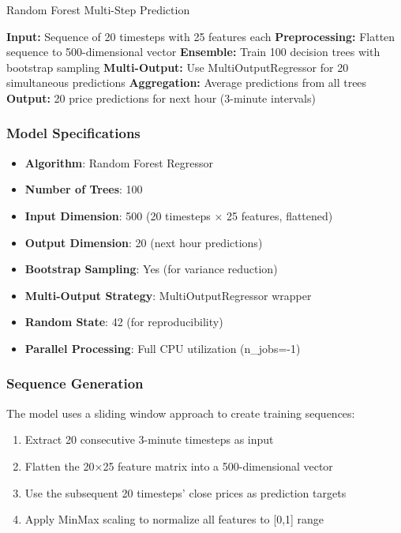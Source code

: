 \documentclass[11pt,a4paper]{article}
\begin{document}
\begin{algorithm}
\caption{Random Forest Multi-Step Prediction}
\begin{algorithmic}[1]
\State \textbf{Input:} Sequence of 20 timesteps with 25 features each
\State \textbf{Preprocessing:} Flatten sequence to 500-dimensional vector
\State \textbf{Ensemble:} Train 100 decision trees with bootstrap sampling
\State \textbf{Multi-Output:} Use MultiOutputRegressor for 20 simultaneous predictions
\State \textbf{Aggregation:} Average predictions from all trees
\State \textbf{Output:} 20 price predictions for next hour (3-minute intervals)
\end{algorithmic}
\end{algorithm}

\subsubsection{Model Specifications}

\begin{itemize}
    \item \textbf{Algorithm}: Random Forest Regressor
    \item \textbf{Number of Trees}: 100
    \item \textbf{Input Dimension}: 500 (20 timesteps × 25 features, flattened)
    \item \textbf{Output Dimension}: 20 (next hour predictions)
    \item \textbf{Bootstrap Sampling}: Yes (for variance reduction)
    \item \textbf{Multi-Output Strategy}: MultiOutputRegressor wrapper
    \item \textbf{Random State}: 42 (for reproducibility)
    \item \textbf{Parallel Processing}: Full CPU utilization (n\_jobs=-1)
\end{itemize}

\subsubsection{Sequence Generation}

The model uses a sliding window approach to create training sequences:

\begin{enumerate}
    \item Extract 20 consecutive 3-minute timesteps as input
    \item Flatten the 20×25 feature matrix into a 500-dimensional vector
    \item Use the subsequent 20 timesteps' close prices as prediction targets
    \item Apply MinMax scaling to normalize all features to [0,1] range
\end{enumerate}
\end{document}
